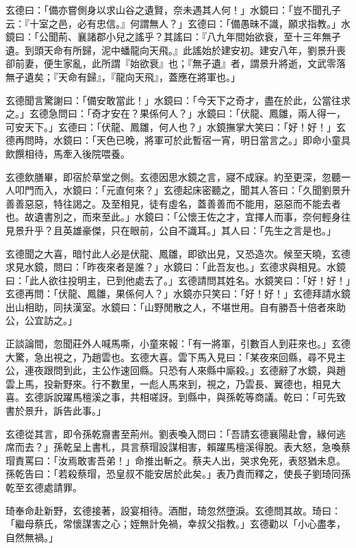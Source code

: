 玄德曰：「備亦嘗側身以求山谷之遺賢，奈未遇其人何！」水鏡曰：「豈不聞孔子云：『十室之邑，必有忠信。』何謂無人？」玄德曰：「備愚昧不識，願求指教。」水鏡曰：「公聞荊、襄諸郡小兒之謠乎？其謠曰：『八九年間始欲衰，至十三年無孑遺。到頭天命有所歸，泥中蟠龍向天飛。』此謠始於建安初。建安八年，劉景升喪卻前妻，便生家亂，此所謂『始欲衰』也；『無孑遺』者，謂景升將逝，文武零落無孑遺矣；『天命有歸』，『龍向天飛』，蓋應在將軍也。」

玄德聞言驚謝曰：「備安敢當此！」水鏡曰：「今天下之奇才，盡在於此，公當往求之。」玄德急問曰：「奇才安在？果係何人？」水鏡曰：「伏龍、鳳雛，兩人得一，可安天下。」玄德曰：「伏龍、鳳雛，何人也？」水鏡撫掌大笑曰：「好！好！」玄德再問時，水鏡曰：「天色已晚，將軍可於此暫宿一宵，明日當言之。」即命小童具飲饌相待，馬牽入後院喂養。

玄德飲膳畢，即宿於草堂之側。玄德因思水鏡之言，寢不成寐。約至更深，忽聽一人叩門而入，水鏡曰：「元直何來？」玄德起床密聽之，聞其人答曰：「久聞劉景升善善惡惡，特往謁之。及至相見，徒有虛名，蓋善善而不能用，惡惡而不能去者也。故遺書別之，而來至此。」水鏡曰：「公懷王佐之才，宜擇人而事，奈何輕身往見景升乎？且英雄豪傑，只在眼前，公自不識耳。」其人曰：「先生之言是也。」

玄德聞之大喜，暗忖此人必是伏龍、鳳雛，即欲出見，又恐造次。候至天曉，玄德求見水鏡，問曰：「昨夜來者是誰？」水鏡曰：「此吾友也。」玄德求與相見。水鏡曰：「此人欲往投明主，已到他處去了。」玄德請問其姓名。水鏡笑曰：「好！好！」玄德再問：「伏龍、鳳雛，果係何人？」水鏡亦只笑曰：「好！好！」玄德拜請水鏡出山相助，同扶漢室。水鏡曰：「山野閒散之人，不堪世用。自有勝吾十倍者來助公，公宜訪之。」

正談論間，忽聞莊外人喊馬嘶，小童來報：「有一將軍，引數百人到莊來也。」玄德大驚，急出視之，乃趙雲也。玄德大喜。雲下馬入見曰：「某夜來回縣，尋不見主公，連夜跟問到此，主公作速回縣。只恐有人來縣中廝殺。」玄德辭了水鏡，與趙雲上馬，投新野來。行不數里，一彪人馬來到，視之，乃雲長、翼德也，相見大喜。玄德訴說躍馬檀溪之事，共相嗟訝。到縣中，與孫乾等商議。乾曰：「可先致書於景升，訴告此事。」

玄德從其言，即令孫乾齎書至荊州。劉表喚入問曰：「吾請玄德襄陽赴會，緣何逃席而去？」孫乾呈上書札，具言蔡瑁設謀相害，賴躍馬檀溪得脫。表大怒，急喚蔡瑁責罵曰：「汝焉敢害吾弟！」命推出斬之。蔡夫人出，哭求免死，表怒猶未息。孫乾告曰：「若殺蔡瑁，恐皇叔不能安居於此矣。」表乃責而釋之，使長子劉琦同孫乾至玄德處請罪。

琦奉命赴新野，玄德接著，設宴相待。酒酣，琦忽然墮淚。玄德問其故。琦曰：「繼母蔡氏，常懷謀害之心；姪無計免禍，幸叔父指教。」玄德勸以「小心盡孝，自然無禍。」

